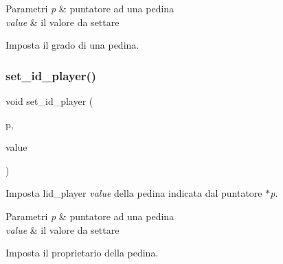 \begin{DoxyParams}{Parametri}
{\em p} & puntatore ad una pedina \\
\hline
{\em value} & il valore da settare\\
\hline
\end{DoxyParams}
Imposta il grado di una pedina. \mbox{\label{group__Ausiliarie_gabbdcb7fca0fe313ecc63bc2ba1a73d8e}} 
\subsubsection{\texorpdfstring{set\+\_\+id\+\_\+player()}{set\_id\_player()}}
{\footnotesize\ttfamily void set\+\_\+id\+\_\+player (\begin{DoxyParamCaption}\item[{\hyperlink{ml__lib_8h_a71fee95122b31f5cb0b07d9c16ffa3a5}{pedina} $\ast$}]{p,  }\item[{\hyperlink{ml__lib_8h_a0330ff92cbc796e96c3ce3e4401bf1e1}{id\+\_\+p}}]{value }\end{DoxyParamCaption})}



Imposta l\textquotesingle{}id\+\_\+player {\itshape value} della pedina indicata dal puntatore {\itshape $\ast$p}. 


\begin{DoxyParams}{Parametri}
{\em p} & puntatore ad una pedina \\
\hline
{\em value} & il valore da settare\\
\hline
\end{DoxyParams}
Imposta il proprietario della pedina. 